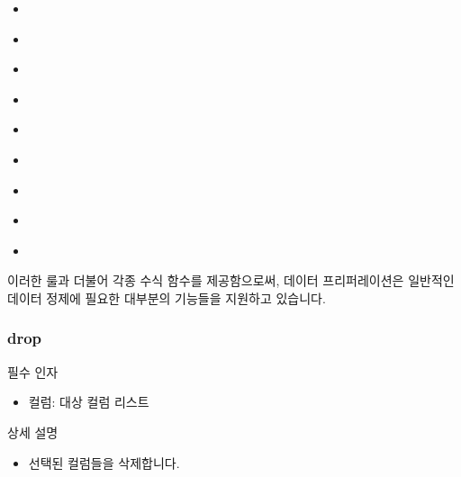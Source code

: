\documentclass[letterpaper,10pt,english]{sphinxmanual}
\begin{document}
\begin{itemize}
\item {} 
{\hyperref[\detokenize{discovery/part07/rule_kinds:nest}]{}}

\item {} 
{\hyperref[\detokenize{discovery/part07/rule_kinds:unnest}]{}}

\item {} 
{\hyperref[\detokenize{discovery/part07/rule_kinds:flatten}]{}}

\item {} 
{\hyperref[\detokenize{discovery/part07/rule_kinds:aggregate}]{}}

\item {} 
{\hyperref[\detokenize{discovery/part07/rule_kinds:pivot}]{}}

\item {} 
{\hyperref[\detokenize{discovery/part07/rule_kinds:unpivot}]{}}

\item {} 
{\hyperref[\detokenize{discovery/part07/rule_kinds:join}]{}}

\item {} 
{\hyperref[\detokenize{discovery/part07/rule_kinds:union}]{}}

\item {} 
{\hyperref[\detokenize{discovery/part07/rule_kinds:window}]{}}

\end{itemize}

이러한 룰과 더불어 각종 수식 함수를 제공함으로써, 데이터 프리퍼레이션은 일반적인 데이터 정제에 필요한 대부분의 기능들을 지원하고 있습니다.


\subsubsection{drop}
\label{\detokenize{discovery/part07/rule_kinds:drop}}
필수 인자
\begin{itemize}
\item {} 
컬럼: 대상 컬럼 리스트

\end{itemize}

상세 설명
\begin{itemize}
\item {} 
선택된 컬럼들을 삭제합니다.

\end{itemize}
\end{document}
